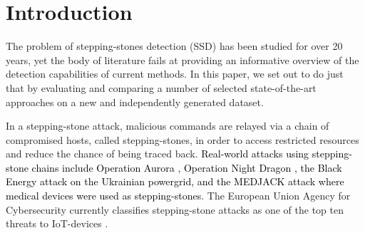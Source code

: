 \documentclass[runningheads,11pt]{llncs}\usepackage[]{graphicx}\usepackage[]{color}
\begin{document}
\section{Introduction}\label{Sec:Introduction}


The problem of stepping-stones detection (SSD) has been studied for over 20 years, yet the body of literature fails at providing an informative overview of the detection capabilities of current methods. In this paper, we set out to do just that by evaluating and comparing a number of selected state-of-the-art approaches on a new and independently generated dataset.


In a stepping-stone attack, malicious commands are relayed via a chain of compromised hosts, called stepping-stones, in order to access restricted resources and reduce the chance of being traced back. \textcolor{black}{Real-world attacks using stepping-stone chains include Operation Aurora \cite{tankard2011advanced}, Operation Night Dragon \cite{mcafee2015report}, the Black Energy \cite{eisac2017report} attack on the Ukrainian powergrid, and the MEDJACK \cite{ayala2016active} attack where medical devices were used as stepping-stones}. The European Union Agency for Cybersecurity currently classifies stepping-stone attacks as one of the top ten threats to IoT-devices \cite{enisa2017baseline}.


\end{document}
